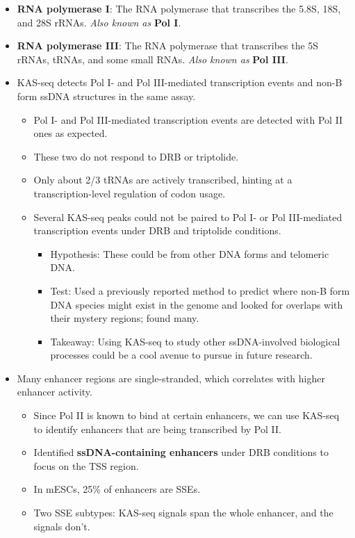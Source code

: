 \documentclass[../notes.tex]{subfiles}
\begin{document}
\begin{itemize}
    \item \textbf{RNA polymerase I}: The RNA polymerase that transcribes the 5.8S, 18S, and 28S rRNAs. \emph{Also known as} \textbf{Pol I}.
    \item \textbf{RNA polymerase III}: The RNA polymerase that transcribes the 5S rRNAs, tRNAs, and some small RNAs. \emph{Also known as} \textbf{Pol III}.
    \item KAS-seq detects Pol I- and Pol III-mediated transcription events and non-B form ssDNA structures in the same assay.
    \begin{itemize}
        \item Pol I- and Pol III-mediated transcription events are detected with Pol II ones as expected.
        \item These two do not respond to DRB or triptolide.
        \item Only about 2/3 tRNAs are actively transcribed, hinting at a transcription-level regulation of codon usage.
        \item Several KAS-seq peaks could not be paired to Pol I- or Pol III-mediated transcription events under DRB and triptolide conditions.
        \begin{itemize}
            \item Hypothesis: These could be from other DNA forms and telomeric DNA.
            \item Test: Used a previously reported method to predict where non-B form DNA species might exist in the genome and looked for overlaps with their mystery regions; found many.
            \item Takeaway: Using KAS-seq to study other ssDNA-involved biological processes could be a cool avenue to pursue in future research.
        \end{itemize}
    \end{itemize}
    \item Many enhancer regions are single-stranded, which correlates with higher enhancer activity.
    \begin{itemize}
        \item Since Pol II is known to bind at certain enhancers, we can use KAS-seq to identify enhancers that are being transcribed by Pol II.
        \item Identified \textbf{ssDNA-containing enhancers} under DRB conditions to focus on the TSS region.
        \item In mESCs, 25\% of enhancers are SSEs.
        \item Two SSE subtypes: KAS-seq signals span the whole enhancer, and the signals don't.

\end{itemize}
\end{itemize}
\end{document}
